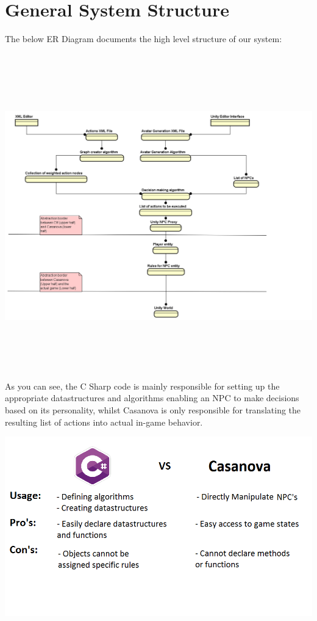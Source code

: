 \documentclass[11pt]{article} %
\begin{document}
\section{General System Structure}
The below ER Diagram documents the high level structure of our system:

~\\
\includegraphics[width=20cm, height=13cm]{SystemEr}
~\\

\newpage
As you can see, the C Sharp code is mainly responsible for setting up the appropriate datastructures and algorithms enabling an NPC to make decisions based on its personality, whilst Casanova is only responsible for translating the resulting list of actions into actual in-game behavior. 

\includegraphics[scale=0.7]{CSHARPVSCASANOVA}
\end{document}

